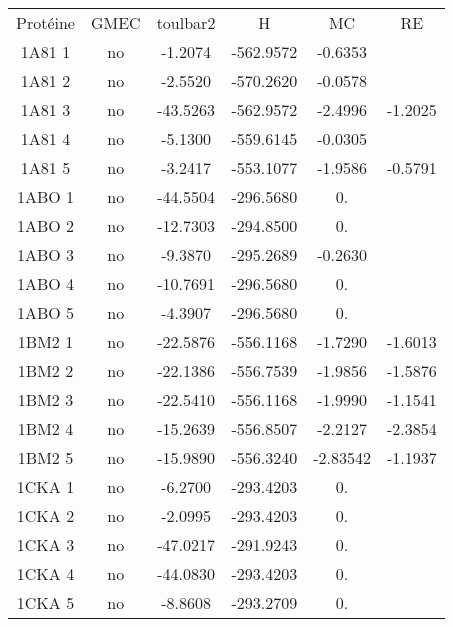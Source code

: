 \begin{table}[h]
      \centering

      \begin{tabular}{cccccc}


        \toprule
        Protéine & GMEC & toulbar2 & H & MC & RE \\
        \cmidrule{1-6}
        1A81 1 & no & -1.2074    &    -562.9572 & -0.6353 &  \\          
        1A81 2 & no & -2.5520    &    -570.2620 & -0.0578 & \\          
        1A81 3 & no & -43.5263   &    -562.9572 & -2.4996 & -1.2025 \\         
        1A81 4 & no & -5.1300    &    -559.6145 & -0.0305 & \\          
        1A81 5 & no & -3.2417    &    -553.1077 & -1.9586 & -0.5791\\         
        1ABO 1 & no & -44.5504   &    -296.5680 & 0. & \\                   
        1ABO 2 & no & -12.7303   &    -294.8500 & 0. & \\                   
        1ABO 3 & no & -9.3870    &    -295.2689 & -0.2630 & \\          
        1ABO 4 & no & -10.7691   &    -296.5680 & 0. & \\                   
        1ABO 5 & no & -4.3907    &    -296.5680 & 0. & \\                    
        1BM2 1 & no & -22.5876   &    -556.1168 & -1.7290 & -1.6013 \\         
        1BM2 2 & no & -22.1386   &    -556.7539 & -1.9856 & -1.5876 \\     
        1BM2 3 & no & -22.5410   &    -556.1168 & -1.9990 & -1.1541 \\
        1BM2 4 & no & -15.2639   &    -556.8507 & -2.2127 & -2.3854 \\         
        1BM2 5 & no & -15.9890   &    -556.3240 & -2.83542 & -1.1937 \\        
        1CKA 1 & no & -6.2700    &    -293.4203 & 0. & \\                    
        1CKA 2 & no & -2.0995    &    -293.4203 & 0. & \\                    
        1CKA 3 & no & -47.0217   &    -291.9243 & 0. & \\                   
        1CKA 4 & no & -44.0830   &    -293.4203 & 0. & \\                   
        1CKA 5 & no & -8.8608    &    -293.2709 & 0. & \\                    

\end{tabular}
\end{table}
